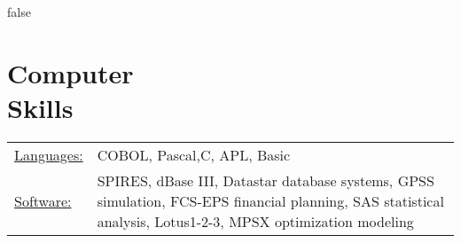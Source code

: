 \documentclass[margin]{res}
\begin{document}
\begin{resume}
\if false
\section{Computer \\ Skills}
   \begin{tabular}{l p{3in}}
    \underline{Languages:} & COBOL, Pascal,C, APL, Basic \\

     \underline{Software:} &  SPIRES, dBase III, Datastar database 
                        systems, GPSS simulation, FCS-EPS financial 
                        planning, SAS statistical analysis, 
                        Lotus1-2-3, MPSX optimization modeling 
   \end{tabular}
 \fi

\end{resume} 
\end{document}

